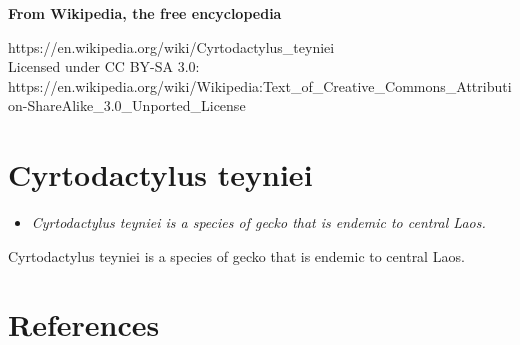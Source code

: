 \textbf{From Wikipedia, the free encyclopedia}

https://en.wikipedia.org/wiki/Cyrtodactylus\_teyniei\\
Licensed under CC BY-SA 3.0:\\
https://en.wikipedia.org/wiki/Wikipedia:Text\_of\_Creative\_Commons\_Attribution-ShareAlike\_3.0\_Unported\_License

\section{Cyrtodactylus teyniei}\label{cyrtodactylus-teyniei}

\begin{itemize}
\item
  \emph{Cyrtodactylus teyniei is a species of gecko that is endemic to
  central Laos.}
\end{itemize}

Cyrtodactylus teyniei is a species of gecko that is endemic to central
Laos.

\section{References}\label{references}
